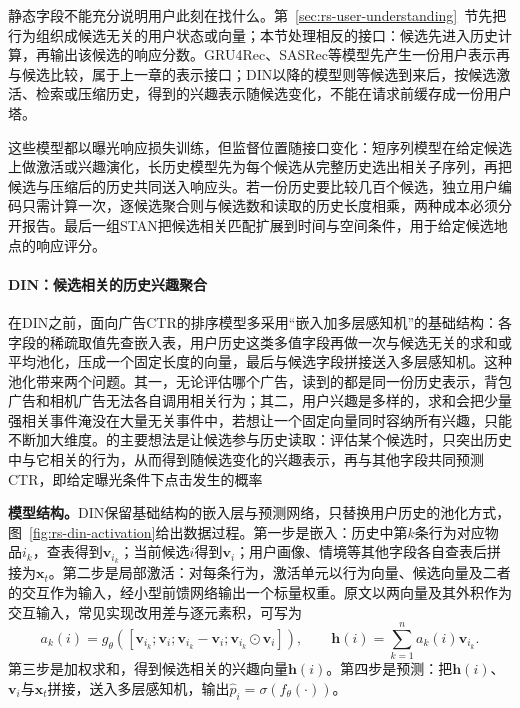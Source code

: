 静态字段不能充分说明用户此刻在找什么。第~\ref{sec:rs-user-understanding}~节先把行为组织成候选无关的用户状态或向量；本节处理相反的接口：候选先进入历史计算，再输出该候选的响应分数。GRU4Rec、SASRec等模型先产生一份用户表示再与候选比较，属于上一章的表示接口；DIN以降的模型则等候选到来后，按候选激活、检索或压缩历史，得到的兴趣表示随候选变化，不能在请求前缓存成一份用户塔。

这些模型都以曝光响应损失训练，但监督位置随接口变化：短序列模型在给定候选上做激活或兴趣演化，长历史模型先为每个候选从完整历史选出相关子序列，再把候选与压缩后的历史共同送入响应头。若一份历史要比较几百个候选，独立用户编码只需计算一次，逐候选聚合则与候选数和读取的历史长度相乘，两种成本必须分开报告。最后一组STAN把候选相关匹配扩展到时间与空间条件，用于给定候选地点的响应评分。

\paragraph{DIN：候选相关的历史兴趣聚合}
\label{sec:rs-din}

在DIN之前，面向广告CTR的排序模型多采用“嵌入加多层感知机”的基础结构：各字段的稀疏取值先查嵌入表，用户历史这类多值字段再做一次与候选无关的求和或平均池化，压成一个固定长度的向量，最后与候选字段拼接送入多层感知机。这种池化带来两个问题。其一，无论评估哪个广告，读到的都是同一份历史表示，背包广告和相机广告无法各自调用相关行为；其二，用户兴趣是多样的，求和会把少量强相关事件淹没在大量无关事件中，若想让一个固定向量同时容纳所有兴趣，只能不断加大维度。的主要想法是让候选参与历史读取：评估某个候选时，只突出历史中与它相关的行为，从而得到随候选变化的兴趣表示，再与其他字段共同预测CTR，即给定曝光条件下点击发生的概率

\textbf{模型结构。}DIN保留基础结构的嵌入层与预测网络，只替换用户历史的池化方式，图~\ref{fig:rs-din-activation}给出数据过程。第一步是嵌入：历史中第$k$条行为对应物品$i_k$，查表得到$\bm{v}_{i_k}$；当前候选$i$得到$\bm{v}_i$；用户画像、情境等其他字段各自查表后拼接为$\bm{x}_t$。第二步是局部激活：对每条行为，激活单元以行为向量、候选向量及二者的交互作为输入，经小型前馈网络输出一个标量权重。原文以两向量及其外积作为交互输入，常见实现改用差与逐元素积，可写为
\begin{equation}
  a_k(i)=g_\theta([\bm{v}_{i_k};\bm{v}_i;
            \bm{v}_{i_k}-\bm{v}_i;
            \bm{v}_{i_k}\odot\bm{v}_i]),\qquad
  \bm{h}(i)=\sum_{k=1}^{n}a_k(i)\bm{v}_{i_k}.
  \label{eq:rs-din-activation}
\end{equation}
第三步是加权求和，得到候选相关的兴趣向量$\bm{h}(i)$。第四步是预测：把$\bm{h}(i)$、$\bm{v}_i$与$\bm{x}_t$拼接，送入多层感知机，输出$\widehat p_i=\sigma(f_\theta(\cdot))$。


